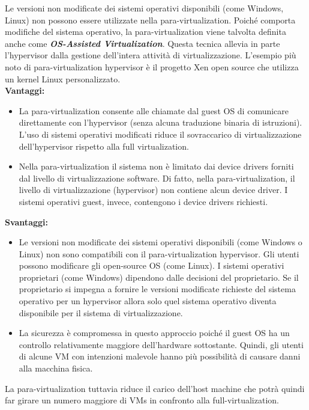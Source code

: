 \documentclass{article}
\begin{document}
Le versioni non modificate dei sistemi operativi disponibili (come Windows, Linux) non possono essere utilizzate nella para-virtualization. Poiché comporta modifiche del sistema operativo, la para-virtualization viene talvolta definita anche come \textit{\textbf{OS-Assisted Virtualization}}. Questa tecnica allevia in parte l'hypervisor dalla gestione dell'intera attività di virtualizzazione. L'esempio più noto di para-virtualization hypervisor è il progetto Xen open source che utilizza un kernel Linux personalizzato. \\
\textbf{Vantaggi:}
\begin{itemize}
    \item La para-virtualization consente alle chiamate dal guest OS di comunicare direttamente con l'hypervisor (senza alcuna traduzione binaria di istruzioni). L'uso di sistemi operativi modificati riduce il sovraccarico di virtualizzazione dell'hypervisor rispetto alla full virtualization.
    \item Nella para-virtualization il sistema non è limitato dai device drivers forniti dal livello di virtualizzazione software. Di fatto, nella para-virtualization, il livello di virtualizzazione (hypervisor) non contiene alcun device driver. I sistemi operativi guest, invece, contengono i device drivers richiesti.
\end{itemize}
\textbf{Svantaggi:}
\begin{itemize}
    \item Le versioni non modificate dei sistemi operativi disponibili (come Windows o Linux) non sono compatibili con il para-virtualization hypervisor. Gli utenti possono modificare gli open-source OS (come Linux). I sistemi operativi proprietari (come Windows) dipendono dalle decisioni del proprietario. Se il proprietario si impegna a fornire le versioni modificate richieste del sistema operativo per un hypervisor allora solo quel sistema operativo diventa disponibile per il sistema di virtualizzazione. 
    \item La sicurezza è compromessa in questo approccio poiché il guest OS ha un controllo relativamente maggiore dell'hardware sottostante. Quindi, gli utenti di alcune VM con intenzioni malevole hanno più possibilità di causare danni alla macchina fisica.
\end{itemize}
La para-virtualization tuttavia riduce il carico dell’host machine che potrà quindi far girare un numero maggiore di VMs in confronto alla full-virtualization.
\end{document}
